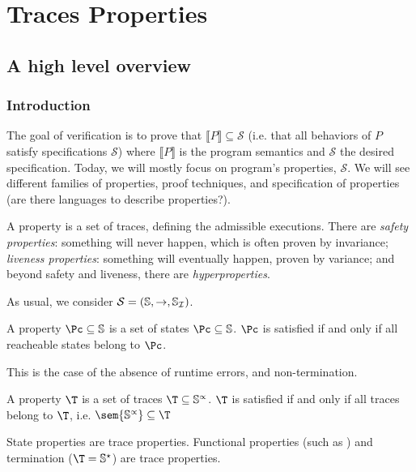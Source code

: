 \documentclass[toc]{../cs-classes/cs-classes}
\begin{document}
\begin{definition}
    
\end{definition}

\newcommand*{\Sc}{\mathcal{S}}
\section{Traces Properties}
\subsection{A high level overview}
\subsubsection{Introduction}
The goal of verification is to prove that $\llbracket P \rrbracket\subseteq \Sc$ (i.e. that all behaviors of $P$ satisfy specifications $\Sc$) where $\llbracket P\rrbracket$ is the program semantics and $\Sc$ the desired specification. Today, we will mostly focus on program's properties, $\Sc$. We will see different families of properties, proof techniques, and specification of properties (are there languages to describe properties?).

A property is a set of traces, defining the admissible executions. There are \emph{safety properties}: something will never happen, which is often proven by invariance; \emph{liveness properties}: something will eventually happen, proven by variance; and beyond safety and liveness, there are \emph{hyperproperties}.

As usual, we consider $\Sc = (\S, \to, \S_{\mathcal{I}})$.
\begin{definition}
    A property $\Pc\subseteq\S$ is a set of states $\Pc\subseteq\S$. $\Pc$ is satisfied if and only if all reacheable states belong to $\Pc$.
\end{definition}
This is the case of the absence of runtime errors, and non-termination.

\begin{definition}
    A property $\T$ is a set of traces $\T \subseteq \S^\propto$. $\T$ is satisfied if and only if all traces belong to $\T$, i.e. $\sem{\S^\propto} \subseteq \T$
\end{definition}
State properties are trace properties. Functional properties (such as ) and termination ($\T=\S^\star$) are trace properties.
\end{document}
